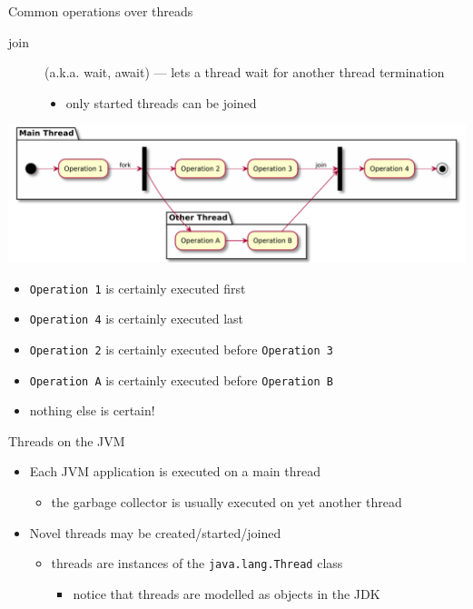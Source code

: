 \documentclass[presentation]{beamer}\mode<presentation>{\usetheme{AMSBolognaFC}}
\begin{document}
\begin{frame}[allowframebreaks]
\begin{exampleblock}{Common operations over threads}
\begin{description}
            \item[join] (a.k.a. wait, await) --- lets a thread wait for another thread termination
            \begin{itemize}
                \item only started threads can be joined
            \end{itemize}
        \end{description}
    \end{exampleblock}

    \begin{center}
        \includegraphics[width=\linewidth]{img/fork-join.pdf}
    \end{center}
    \begin{itemize}
        \item \texttt{Operation 1} is certainly executed first
        \item \texttt{Operation 4} is certainly executed last
        \item \texttt{Operation 2} is certainly executed before \texttt{Operation 3}
        \item \texttt{Operation A} is certainly executed before \texttt{Operation B}
        \item nothing else is certain!
    \end{itemize}

    \framebreak

    \begin{block}{Threads on the JVM}
        \begin{itemize}
            \item Each JVM application is executed on a main thread
            \begin{itemize}
                \item the garbage collector is usually executed on yet another thread
            \end{itemize}

            \item Novel threads may be created/started/joined
            \begin{itemize}
                \item threads are instances of the \texttt{java.lang.\alert{Thread}} class
                \begin{itemize}
                    \item notice that threads are modelled as objects in the JDK
                \end{itemize}
            \end{itemize}


\end{itemize}
\end{block}
\end{frame}
\end{document}
